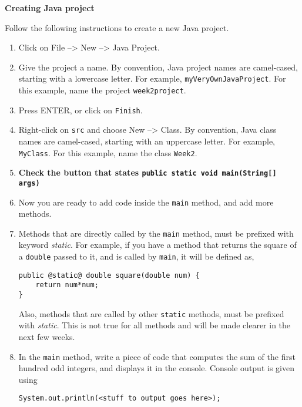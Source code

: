 \begin{questions}
\vskip 0.5cm

\question \textbf{Creating Java project} \vskip 0.5cm

Follow the following instructions to create a new Java project.

\begin{enumerate}
\item Click on File --> New --> Java Project.
\item Give the project a name. By convention, Java project names are camel-cased, starting with a lowercase letter. For example, \texttt{myVeryOwnJavaProject}. For this example, name the project \texttt{week2project}.
\item Press ENTER, or click on \texttt{Finish}.
\item Right-click on \texttt{src} and choose New --> Class. By convention, Java class names are camel-cased, starting with an uppercase letter. For example, \texttt{MyClass}. For this example, name the class \texttt{Week2}.
\item \color{red} \textbf{Check the button that states \texttt{public static void main(String[] args)}} \color{black}
\item Now you are ready to add code inside the \texttt{main} method, and add more methods.
\item Methods that are directly called by the \texttt{main} method, must be prefixed with keyword \emph{static}. For example, if you have a method that returns the square of a \texttt{double} passed to it, and is called by \texttt{main}, it will be defined as,

\begin{lstlisting}[style=correct]
public @static@ double square(double num) {
	return num*num;
}
\end{lstlisting}

Also, methods that are called by other \texttt{static} methods, must be prefixed with \emph{static}. This is not true for all methods and will be made clearer in the next few weeks.
\item In the \texttt{main} method, write a piece of code that computes the sum of the first hundred odd integers, and displays it in the console. Console output is given using 

\begin{lstlisting}[numbers=none]
System.out.println(<stuff to output goes here>);	
\end{lstlisting}

\end{enumerate}


\end{questions}
